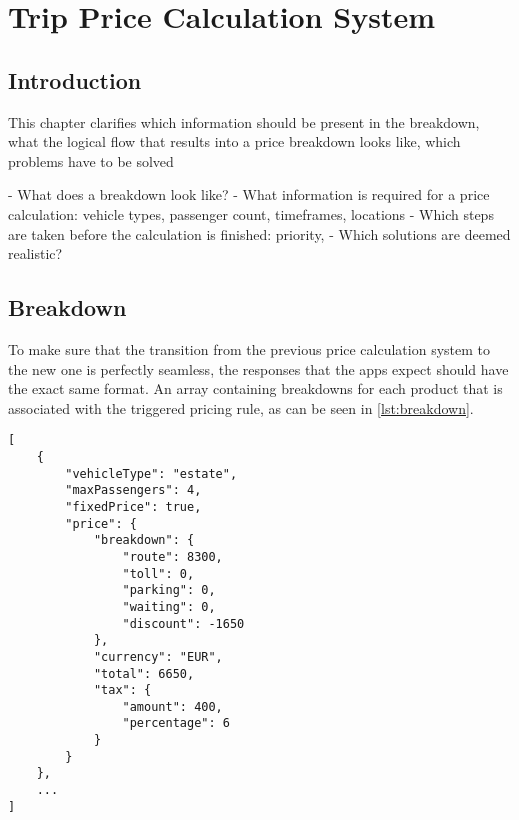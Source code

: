 \graphicspath{{Chapter4/Figs/Vector/}{Chapter4/Figs/}}

%
\chapter{Trip Price Calculation System}
\section{Introduction}
This chapter clarifies which information should be present in the breakdown, what the logical flow that results into a price breakdown looks like, which problems have to be solved


- What does a breakdown look like?
- What information is required for a price calculation: vehicle types, passenger count, timeframes, locations
- Which steps are taken before the calculation is finished: priority,
- Which solutions are deemed realistic?

%
\section{Breakdown}
To make sure that the transition from the previous price calculation system to the new one is perfectly seamless, the responses that the apps expect should have the exact same format. An array containing breakdowns for each product that is associated with the triggered pricing rule, as can be seen in \ref{lst:breakdown}.

\begin{lstlisting}[caption={Array of products with pricing}, label={lst:breakdown}]
[
	{
		"vehicleType": "estate",
		"maxPassengers": 4,
		"fixedPrice": true,
		"price": {
			"breakdown": {
				"route": 8300,
				"toll": 0,
				"parking": 0,
				"waiting": 0,
				"discount": -1650
			},
			"currency": "EUR",
			"total": 6650,
			"tax": {
				"amount": 400,
				"percentage": 6
			}
		}
	},
	...
]
\end{lstlisting}

